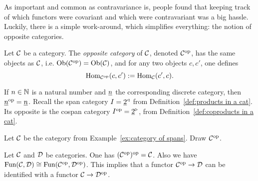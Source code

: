 \documentclass[CT4S-EN-RU]{subfiles}
\begin{document}
\begin{blockRUS}
\end{blockRUS}

\begin{blockENG}
As important and common as contravariance is, people found that keeping track of which functors were covariant and which were contravariant was a big hassle. Luckily, there is a simple work-around, which simplifies everything: the notion of opposite categories.
\end{blockENG}

\begin{blockRUS}
\end{blockRUS}

\begin{definitionENG}
Let $\mathcal{C}$ be a category. The {\em opposite category} of $\mathcal{C}$, denoted $\mathcal{C}^\textnormal{op}$, has the same objects as $\mathcal{C}$, i.e. $\textnormal{Ob}(\mathcal{C}^\textnormal{op})=\textnormal{Ob}(\mathcal{C})$, and for any two objects $c,c'$, one defines
$$\textnormal{Hom}_{\mathcal{C}^\textnormal{op}}(c,c'):=\textnormal{Hom}_\mathcal{C}(c',c).$$
\end{definitionENG}

\begin{definitionRUS}
\end{definitionRUS}

\begin{exampleENG}
If $n\in{\mathbb N}$ is a natural number and $\underline{n}$ the corresponding discrete category, then $\underline{n}^\textnormal{op}=\underline{n}$. Recall  the span category $I=\underline{2}^\triangleleft$ from Definition~\ref{def:products in a cat}. Its opposite is the cospan category $I^\textnormal{op}=\underline{2}^\triangleright$, from Definition~\ref{def:coproducts in a cat}.
\end{exampleENG}

\begin{exampleRUS}
\end{exampleRUS}

\begin{exerciseENG}
Let $\mathcal{C}$ be the category from Example~\ref{ex:category of spans}. Draw $\mathcal{C}^\textnormal{op}$.
\end{exerciseENG}

\begin{exerciseRUS}
\end{exerciseRUS}

\begin{lemmaENG}
Let $\mathcal{C}$ and $\mathcal{D}$ be categories. One has $(\mathcal{C}^\textnormal{op})^\textnormal{op}=\mathcal{C}$. Also we have $\textnormal{Fun}(\mathcal{C},\mathcal{D})\cong\textnormal{Fun}(\mathcal{C}^\textnormal{op},\mathcal{D}^\textnormal{op})$. This implies that a functor $\mathcal{C}^\textnormal{op}\rightarrow\mathcal{D}$ can be identified with a functor $\mathcal{C}\rightarrow\mathcal{D}^\textnormal{op}$.
\end{lemmaENG}
\end{document}
